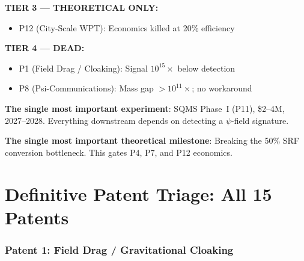 \documentclass[11pt]{article}
\begin{document}
\begin{tcolorbox}[colback=blue!5!white, colframe=blue!60!black,
  title=\textbf{W3i8 PATENT TRIAGE: READ THIS FIRST}]
\textbf{TIER 3 --- THEORETICAL ONLY:}
\begin{itemize}[nosep]
  \item P12 (City-Scale WPT): Economics killed at 20\% efficiency
\end{itemize}

\textbf{TIER 4 --- DEAD:}
\begin{itemize}[nosep]
  \item P1 (Field Drag / Cloaking): Signal $10^{15}\times$ below detection
  \item P8 (Psi-Communications): Mass gap $>10^{11}\times$; no workaround
\end{itemize}

\medskip
\textbf{The single most important experiment}: SQMS Phase~I (P11),
\$2--4M, 2027--2028. Everything downstream depends on detecting a
$\psi$-field signature.

\textbf{The single most important theoretical milestone}: Breaking the
50\% SRF conversion bottleneck. This gates P4, P7, and P12 economics.

\end{tcolorbox}

\part{Definitive Patent Triage: All 15 Patents}
\label{part:triage}

\section{Patent 1: Field Drag / Gravitational Cloaking}
\label{sec:P1}
\end{document}
